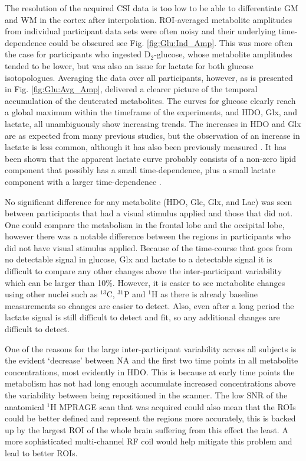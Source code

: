 The resolution of the acquired \ac{CSI} data is too low to be able to differentiate \ac{GM} and \ac{WM} in the cortex after interpolation. \ac{ROI}-averaged metabolite amplitudes from individual participant data sets were often noisy and their underlying time-dependence could be obscured see Fig. \ref{fig:Glu:Ind_Amp}. This was more often the case for participants who ingested D$_2$-glucose, whose metabolite amplitudes tended to be lower, but was also an issue for lactate for both glucose isotopologues. Averaging the data over all participants, however, as is presented in Fig. \ref{fig:Glu:Avg_Amp}, delivered a clearer picture of the temporal accumulation of the deuterated metabolites. The curves for glucose clearly reach a global maximum within the timeframe of the experiments, and \ac{HDO}, Glx, and lactate, all unambiguously show increasing trends. The increases in \ac{HDO} and Glx are as expected from many previous studies, but the observation of an increase in lactate is less common, although it has also been previously measured  \cite{Ruhm2021DeuteriumResolution, Kaggie2022DeuteriumMetabolism}. It has been shown that the apparent lactate curve probably consists of a non-zero lipid component that possibly has a small time-dependence, plus a small lactate component with a larger time-dependence \cite{Ruhm2021DeuteriumResolution}.     

No significant difference for any metabolite (\ac{HDO}, Glc, Glx, and Lac) was seen between participants that had a visual stimulus applied and those that did not. One could compare the metabolism in the frontal lobe and the occipital lobe, however there was a notable difference between the regions in participants who did not have visual stimulus applied. Because of the time-course that goes from no detectable signal in glucose, Glx and lactate to a detectable signal it is difficult to compare any other changes above the inter-participant variability which can be larger than 10\%. However, it is easier to see metabolite changes using other nuclei such as $^{13}$C, $^{31}$P and $^1$H as there is already baseline measurements so changes are easier to detect. Also, even after a long period the lactate signal is still difficult to detect and fit, so any additional changes are difficult to detect.  

One of the reasons for the large inter-participant variability across all subjects is the evident ‘decrease’ between \ac{NA} and the first two time points in all metabolite concentrations, most evidently in HDO. This is because at early time points the metabolism has not had long enough accumulate increased concentrations above the variability between being repositioned in the scanner. The low \ac{SNR} of the anatomical $^1$H \ac{MPRAGE} scan that was acquired could also mean that the \ac{ROI}s could be better defined and represent the regions more accurately, this is backed up by the largest ROI of the whole brain suffering from this effect the least. A more sophisticated multi-channel RF coil would help mitigate this problem and lead to better \ac{ROI}s.


